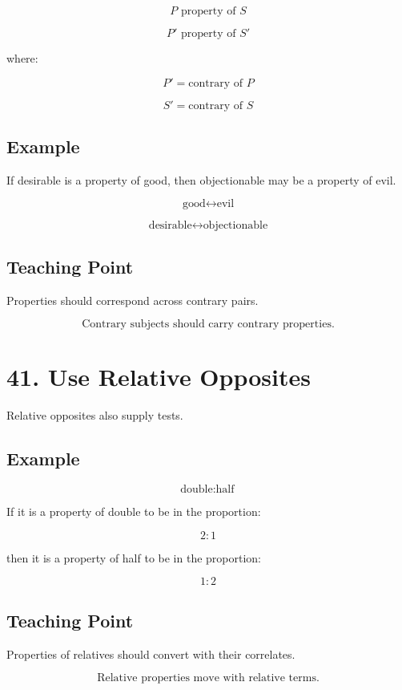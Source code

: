 \documentclass[12pt]{article}
\begin{document}
\[
P \text{ property of } S
\]

\[
P' \text{ property of } S'
\]

where:

\[
P' = \text{contrary of } P
\]

\[
S' = \text{contrary of } S
\]

\subsection*{Example}

If desirable is a property of good, then objectionable may be a property of
evil.

\[
\text{good} \leftrightarrow \text{evil}
\]

\[
\text{desirable} \leftrightarrow \text{objectionable}
\]

\subsection*{Teaching Point}

Properties should correspond across contrary pairs.

\[
\boxed{
\text{Contrary subjects should carry contrary properties.}
}
\]

\section*{41. Use Relative Opposites}

Relative opposites also supply tests.

\subsection*{Example}

\[
\text{double} : \text{half}
\]

If it is a property of double to be in the proportion:

\[
2:1
\]

then it is a property of half to be in the proportion:

\[
1:2
\]

\subsection*{Teaching Point}

Properties of relatives should convert with their correlates.

\[
\boxed{
\text{Relative properties move with relative terms.}
}
\]
\end{document}
